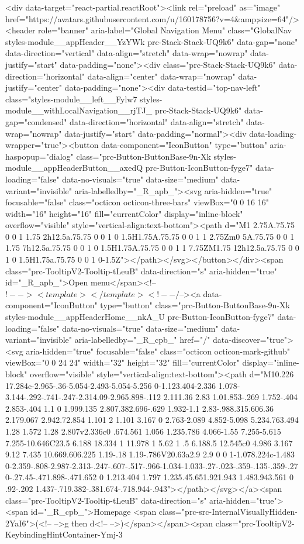 {{  <div data-target="react-partial.reactRoot"><link rel="preload" as="image" href="https://avatars.githubusercontent.com/u/160178756?v=4&amp;size=64"/><header role="banner" aria-label="Global Navigation Menu" class="GlobalNav styles-module__appHeader__YzYWk prc-Stack-Stack-UQ9k6" data-gap="none" data-direction="vertical" data-align="stretch" data-wrap="nowrap" data-justify="start" data-padding="none"><div class="prc-Stack-Stack-UQ9k6" data-direction="horizontal" data-align="center" data-wrap="nowrap" data-justify="center" data-padding="none"><div data-testid="top-nav-left" class="styles-module__left__Fylw7 styles-module__withLocalNavigation__rjTJ_ prc-Stack-Stack-UQ9k6" data-gap="condensed" data-direction="horizontal" data-align="stretch" data-wrap="nowrap" data-justify="start" data-padding="normal"><div data-loading-wrapper="true"><button data-component="IconButton" type="button" aria-haspopup="dialog" class="prc-Button-ButtonBase-9n-Xk styles-module__appHeaderButton__axedQ prc-Button-IconButton-fyge7" data-loading="false" data-no-visuals="true" data-size="medium" data-variant="invisible" aria-labelledby="_R_apb_"><svg aria-hidden="true" focusable="false" class="octicon octicon-three-bars" viewBox="0 0 16 16" width="16" height="16" fill="currentColor" display="inline-block" overflow="visible" style="vertical-align:text-bottom"><path d="M1 2.75A.75.75 0 0 1 1.75 2h12.5a.75.75 0 0 1 0 1.5H1.75A.75.75 0 0 1 1 2.75Zm0 5A.75.75 0 0 1 1.75 7h12.5a.75.75 0 0 1 0 1.5H1.75A.75.75 0 0 1 1 7.75ZM1.75 12h12.5a.75.75 0 0 1 0 1.5H1.75a.75.75 0 0 1 0-1.5Z"></path></svg></button></div><span class="prc-TooltipV2-Tooltip-tLeuB" data-direction="s" aria-hidden="true" id="_R_apb_">Open menu</span><!--$!--><template></template><!--/$--><a data-component="IconButton" type="button" class="prc-Button-ButtonBase-9n-Xk styles-module__appHeaderHome__nkA_U prc-Button-IconButton-fyge7" data-loading="false" data-no-visuals="true" data-size="medium" data-variant="invisible" aria-labelledby="_R_cpb_" href="/" data-discover="true"><svg aria-hidden="true" focusable="false" class="octicon octicon-mark-github" viewBox="0 0 24 24" width="32" height="32" fill="currentColor" display="inline-block" overflow="visible" style="vertical-align:text-bottom"><path d="M10.226 17.284c-2.965-.36-5.054-2.493-5.054-5.256 0-1.123.404-2.336 1.078-3.144-.292-.741-.247-2.314.09-2.965.898-.112 2.111.36 2.83 1.01.853-.269 1.752-.404 2.853-.404 1.1 0 1.999.135 2.807.382.696-.629 1.932-1.1 2.83-.988.315.606.36 2.179.067 2.942.72.854 1.101 2 1.101 3.167 0 2.763-2.089 4.852-5.098 5.234.763.494 1.28 1.572 1.28 2.807v2.336c0 .674.561 1.056 1.235.786 4.066-1.55 7.255-5.615 7.255-10.646C23.5 6.188 18.334 1 11.978 1 5.62 1 .5 6.188.5 12.545c0 4.986 3.167 9.12 7.435 10.669.606.225 1.19-.18 1.19-.786V20.63a2.9 2.9 0 0 1-1.078.224c-1.483 0-2.359-.808-2.987-2.313-.247-.607-.517-.966-1.034-1.033-.27-.023-.359-.135-.359-.27 0-.27.45-.471.898-.471.652 0 1.213.404 1.797 1.235.45.651.921.943 1.483.943.561 0 .92-.202 1.437-.719.382-.381.674-.718.944-.943"></path></svg></a><span class="prc-TooltipV2-Tooltip-tLeuB" data-direction="s" aria-hidden="true"><span id="_R_cpb_">Homepage <span class="prc-src-InternalVisuallyHidden-2YaI6">(<!-- -->g then d<!-- -->)</span></span><span class="prc-TooltipV2-KeybindingHintContainer-Ymj-3 }}
